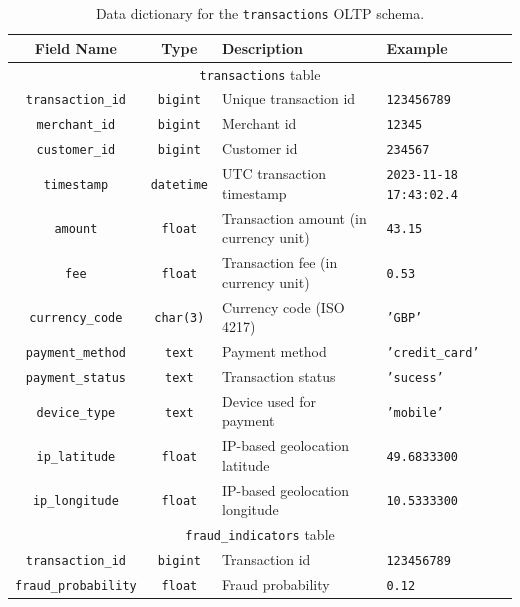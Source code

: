 \documentclass[11pt,a4paper,computermodern]{article}
\newcommand{\code}{\texttt}
\begin{document}
\begin{table}[ht]
	\centering
	\begin{threeparttable}
		\caption{Data dictionary for the \code{transactions} OLTP schema.}
		\label{table:OLTP}
		\begin{tabularx}{0.99\textwidth}{c c >{\centering\arraybackslash}X >{\centering\arraybackslash}X}
			\toprule
			Field Name & Type & Description & Example  \\
			\midrule
			\multicolumn{4}{c}{\code{transactions} table}\\
			\code{transaction\_id} & \code{bigint} & Unique transaction id & \code{123456789} \\
			\code{merchant\_id} & \code{bigint} & Merchant id & \code{12345} \\
			\code{customer\_id} & \code{bigint} & Customer id & \code{234567} \\
			\code{timestamp} & \code{datetime} & UTC transaction timestamp & \code{2023-11-18 17:43:02.4} \\
			\code{amount} & \code{float} & Transaction amount (in currency unit) & \code{43.15} \\
			\code{fee} & \code{float} & Transaction fee (in currency unit) & \code{0.53} \\
			\code{currency\_code} & \code{char(3)} & Currency code (ISO 4217) & \code{'GBP'} \\
			\code{payment\_method} & \code{text} & Payment method & \code{'credit\_card'} \\
			\code{payment\_status} & \code{text} & Transaction status & \code{'sucess'} \\
			\code{device\_type} & \code{text} & Device used for payment & \code{'mobile'} \\
			\code{ip\_latitude} & \code{float} & IP-based geolocation latitude & \code{49.6833300} \\
			\code{ip\_longitude} & \code{float} & IP-based geolocation longitude & \code{10.5333300} \\
			
			\midrule
			\multicolumn{4}{c}{\code{fraud\_indicators} table}\\
			\code{transaction\_id} & \code{bigint} & Transaction id & \code{123456789} \\
			\code{fraud\_probability} & \code{float} & Fraud probability & \code{0.12} \\
			\bottomrule
		\end{tabularx}
	\end{threeparttable}
\end{table}
\end{document}
